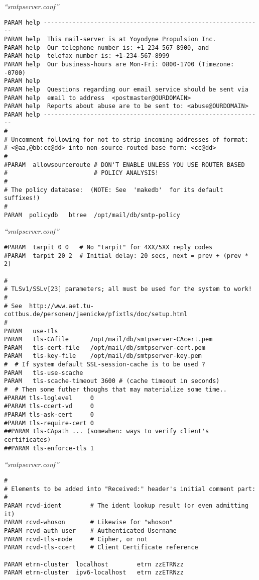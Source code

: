 \documentclass[a4paper,landscape]{slides}
\begin{document}
\begin{overlay}
\small
\centerline{{\it ``smtpserver.conf''}}
\tiny
\begin{verbatim}
PARAM help -------------------------------------------------------------
PARAM help  This mail-server is at Yoyodyne Propulsion Inc.
PARAM help  Our telephone number is: +1-234-567-8900, and
PARAM help  telefax number is: +1-234-567-8999
PARAM help  Our business-hours are Mon-Fri: 0800-1700 (Timezone: -0700)
PARAM help
PARAM help  Questions regarding our email service should be sent via
PARAM help  email to address  <postmaster@OURDOMAIN>
PARAM help  Reports about abuse are to be sent to: <abuse@OURDOMAIN>
PARAM help -------------------------------------------------------------
#
# Uncomment following for not to strip incoming addresses of format:
# <@aa,@bb:cc@dd> into non-source-routed base form: <cc@dd>
#
#PARAM  allowsourceroute # DON'T ENABLE UNLESS YOU USE ROUTER BASED
#                        # POLICY ANALYSIS!
#
# The policy database:  (NOTE: See  'makedb'  for its default suffixes!)
#
PARAM  policydb   btree  /opt/mail/db/smtp-policy
\end{verbatim}
\end{overlay}
\begin{overlay}
\small
\centerline{{\it ``smtpserver.conf''}}
\tiny
\begin{verbatim}
#PARAM  tarpit 0 0   # No "tarpit" for 4XX/5XX reply codes
#PARAM  tarpit 20 2  # Initial delay: 20 secs, next = prev + (prev * 2)

#
# TLSv1/SSLv[23] parameters; all must be used for the system to work!
#
# See  http://www.aet.tu-cottbus.de/personen/jaenicke/pfixtls/doc/setup.html
#
PARAM   use-tls
PARAM   tls-CAfile      /opt/mail/db/smtpserver-CAcert.pem
PARAM   tls-cert-file   /opt/mail/db/smtpserver-cert.pem
PARAM   tls-key-file    /opt/mail/db/smtpserver-key.pem
#  # If system default SSL-session-cache is to be used ?
PARAM   tls-use-scache
PARAM   tls-scache-timeout 3600 # (cache timeout in seconds)
#  # Then some futher thoughs that may materialize some time..
#PARAM tls-loglevel     0
#PARAM tls-ccert-vd     0
#PARAM tls-ask-cert     0
#PARAM tls-require-cert 0
##PARAM tls-CApath ... (somewhen: ways to verify client's certificates)
##PARAM tls-enforce-tls 1
\end{verbatim}
\end{overlay}
\begin{overlay}
\small
\centerline{{\it ``smtpserver.conf''}}
\tiny
\begin{verbatim}
#
# Elements to be added into "Received:" header's initial comment part:
#
PARAM rcvd-ident        # The ident lookup result (or even admitting it)
PARAM rcvd-whoson       # Likewise for "whoson"
PARAM rcvd-auth-user    # Authenticated Username
PARAM rcvd-tls-mode     # Cipher, or not
PARAM rcvd-tls-ccert    # Client Certificate reference

PARAM etrn-cluster  localhost        etrn zzETRNzz
PARAM etrn-cluster  ipv6-localhost   etrn zzETRNzz
\end{verbatim}
\end{overlay}
\end{document}
